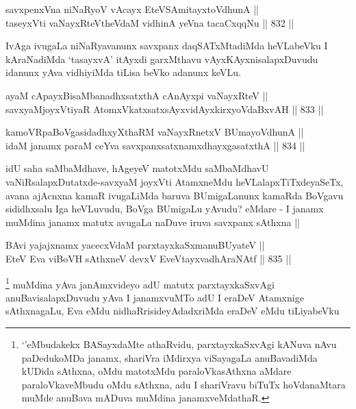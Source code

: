 \begin{shl}
savxpenxVna niNaRyoV vAcayx EteVSAmitayxtoV\s dhunA || \\
taseyxVti vaNayxRteV\s theVdaM vidhinA yeVna tacaCxqqNu ||  832 ||  
\end{shl}

\begin{artha}
IvAga ivugaLa niNaRyavanunx savxpanx daqSATxMtadiMda heVLabeVku I kAraNadiMda `tasayxvA' itAyxdi garxMthavu vAyxKAyxnisalapxDuvudu idanunx yAva vidhiyiMda tiLisa beVko adanunx keVLu.
\end{artha}

\begin{shl}
ayaM cApayxBisaMbanadhxsatxthA cAnAyx\s pi vaNayxRteV || \\
savxyaMjoyxVtiyaR AtomxVkatxsatxsAyxvidAyxkirxyoVdaBxvAH ||  833 ||  
\end{shl}
				
\begin{shl}
kamoVRpaBoVgasidadhxyXthaRM vaNayxRnetxV BUmayoV\s dhunA || \\
idaM janamx paraM ceYva savxpanxsatxnamxdhayxgasatxthA ||  834 ||  
\end{shl}

\begin{artha}
idU saha saMbaMdhave, hAgeyeV matotxMdu saMbaMdhavU vaNiRsalapxDutatxde-savxyaM joyxVti AtamxneMdu heVLalapxTiTxdeyaSeTx, avana ajAcnxna kamaR ivugaLiMda baruva BUmigaLanunx kamaRda BoVgavu sididhxsalu Iga heVLuvudu, BoVga BUmigaLu yAvudu? eMdare - I janamx muMdina janamx matutx avugaLa naDuve iruva savxpanx sAthxna ||
\end{artha}


\begin{shl}
BAvi yajajxnamx yacecxVdaM parxtayxkaSxmanuBUyateV || \\
EteV Eva viBoVH sAthxneV devxV EveVtayxvadhAraNAtf ||  835 ||  
\end{shl}

\begin{artha}
\footnote{`\stext'eMbudakekx BASayxdaMte athaRvidu, parxtayxkaSxvAgi kANuva nAvu paDedukoMDa janamx, shariVra iMdirxya viSayagaLa anuBavadiMda kUDida sAthxna, oMdu matotxMdu paraloVkasAthxna aMdare paraloVkaveMbudu oMdu sAthxna, adu I shariVravu biTuTx hoVdanaMtara muMde anuBava mADuva muMdina janamxveMdathaR.}
muMdina yAva janAmxvideyo adU matutx parxtayxkaSxvAgi anuBavisalapxDuvudu yAva I janamxvuMTo adU I eraDeV Atamxnige sAthxnagaLu, Eva eMdu nidhaRrisideyAdadxriMda eraDeV eMdu tiLiyabeVku 
\end{artha}

